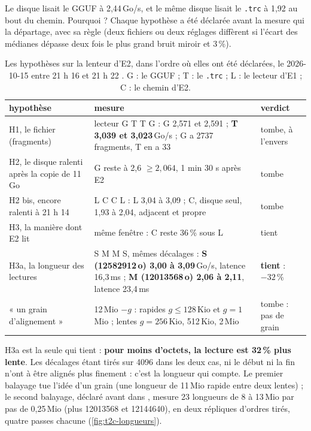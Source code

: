 Le disque lisait le GGUF à 2,44\,Go/s, et le même disque lisait le \texttt{.trc} à 1,92 au bout du chemin. Pourquoi ? Chaque hypothèse a été déclarée avant la mesure qui la départage, avec sa règle (deux fichiers ou deux réglages diffèrent si l'écart des médianes dépasse deux fois le plus grand bruit miroir et 3\,\%).

\begin{table}[ht]
\centering\small
\caption[Les hypothèses, tuées ou gardées par les nombres]{Les hypothèses sur la lenteur d'E2, dans l'ordre où elles ont été déclarées, le 2026-10-15 entre 21 h 16 et 21 h 22 \mes. G : le GGUF ; T : le \texttt{.trc} ; L : le lecteur d'E1 ; C : le chemin d'E2.}
\label{tab:t2c-hypotheses}
\begin{tabularx}{\linewidth}{@{}p{3.6cm}Xp{2.2cm}@{}}
\toprule
hypothèse & mesure & verdict \\
\midrule
H1, le fichier (fragments) & lecteur G T T G : G 2,571 et 2,591 ; \textbf{T 3,039 et 3,023}\,Go/s ; G a \num{2737} fragments, T en a 33 & tombe, à l'envers \\
H2, le disque ralenti après la copie de 11\,Go & G reste à 2,6 $\ge 2{,}064$, 1 min 30 s après E2 & tombe \\
H2 bis, encore ralenti à 21 h 14 & L C C L : L 3,04 à 3,09 ; C, disque seul, 1,93 à 2,04, adjacent et propre & tombe \\
H3, la manière dont E2 lit & même fenêtre : C reste 36\,\% sous L & tient \\
H3a, la longueur des lectures & S M M S, mêmes décalages : \textbf{S (\num{12582912}\,o) 3,00 à 3,09}\,Go/s, latence 16,3\,ms ; \textbf{M (\num{12013568}\,o) 2,06 à 2,11}, latence 23,4\,ms & \textbf{tient} : $-32\,\%$ \\
« un grain d'alignement » & 12\,Mio $- g$ : rapides $g \le 128$\,Kio et $g = 1$\,Mio ; lentes $g = 256$\,Kio, 512\,Kio, 2\,Mio & tombe : pas de grain \\
\bottomrule
\end{tabularx}
\end{table}

H3a est la seule qui tient : \textbf{pour moins d'octets, la lecture est 32\,\% plus lente}. Les décalages étant tirés sur \num{4096} dans les deux cas, ni le début ni la fin n'ont à être alignés plus finement : c'est la longueur qui compte. Le premier balayage tue l'idée d'un grain (une longueur de 11\,Mio rapide entre deux lentes) ; le second balayage, déclaré avant dans , mesure 23 longueurs de 8 à 13\,Mio par pas de 0,25\,Mio (plus \num{12013568} et \num{12144640}), en deux répliques d'ordres tirés, quatre passes chacune (\cref{fig:t2c-longueurs}).

